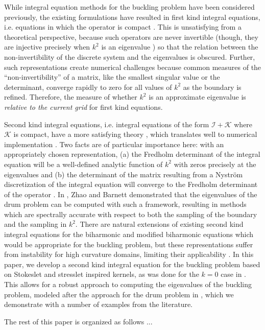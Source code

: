 While integral equation methods for the buckling problem
have been considered previously, the existing formulations
have resulted in first kind integral equations, i.e. equations
in which the operator is compact \cite{kitahara2014boundary,
  antunes2011buckling}. This is unsatisfying from a theoretical
perspective, because such operators are never invertible
(though, they are injective precisely when $k^2$ is an
eigenvalue \cite{kitahara2014boundary}) so that the
relation between the non-invertibility of the discrete system
and the eigenvalues is obscured. Further, such representations
create numerical challenges because common measures of the
``non-invertibility'' of a matrix, like the smallest singular
value or the determinant, converge rapidly to zero for all
values of $k^2$ as the boundary is refined. Therefore, the
measure of whether $k^2$ is an approximate eigenvalue is
{\em relative to the current grid} for first kind equations.

Second kind integral equations, i.e. integral equations
of the form $\mathcal{I} + \mathcal{K}$ where $\mathcal{K}$
is compact, have a more satisfying theory
\cite{reed1972methods,kress1989linear},
which translates well to numerical implementation
\cite{atkinson2009numerical,bornemann2010numerical,
  hackbusch2012integral,zhao2015robust}. Two facts are
of particular importance here: with an appropriately
chosen representation, (a) the Fredholm determinant of the
integral equation will be a well-defined analytic function
of $k^2$ with zeros precisely at the eigenvalues and (b) the 
determinant of the matrix resulting from
a Nystr\"{o}m discretization of the integral equation
will converge to the Fredholm determinant of the operator
\cite{bornemann2010numerical}.
In \cite{zhao2015robust}, Zhao and Barnett demonstrated
that the eigenvalues of the drum problem can be
computed with such a framework, resulting in
methods which are spectrally accurate with respect
to both the sampling of the boundary and the sampling
in $k^2$. There are natural extensions of existing second
kind integral
equations for the biharmonic \cite{farkas1989mathematical}
and modified biharmonic \cite{jiang2013second} equations
which would be appropriate for the buckling problem, but
these representations suffer from instability for
high curvature domains, limiting their applicability
\cite{rachh2017integral}.
In this paper, we develop a second kind integral
equation for the buckling problem based on Stokeslet
and stresslet inspired kernels, as was done for the
$k=0$ case in \cite{rachh2017integral}. This allows
for a robust approach to computing the eigenvalues
of the buckling problem, modeled after the approach for
the drum problem in \cite{zhao2015robust}, which we
demonstrate with a number of examples from the
literature.

The rest of this paper is organized as follows ...

